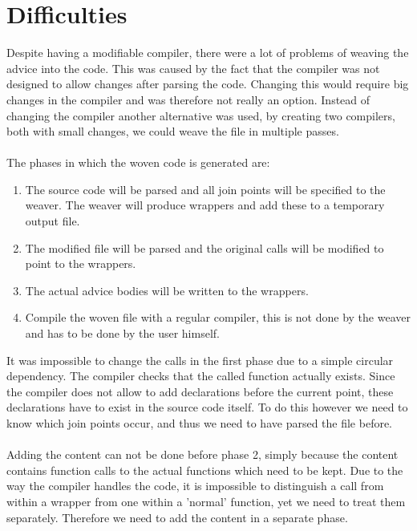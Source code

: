 \documentclass[a4paper]{report}
\begin{document}
\section{Difficulties}
Despite having a modifiable compiler, there were a lot of problems of weaving the advice into the code. This was caused by the fact that the compiler was not designed to allow changes after parsing the code. Changing this would require big changes in the compiler and was therefore not really an option. Instead of changing the compiler another alternative was used, by creating two compilers, both with small changes, we could weave the file in multiple passes.\\
\\
The phases in which the woven code is generated are:
\begin{enumerate}
\item The source code will be parsed and all join points will be specified to the weaver. The weaver will produce wrappers and add these to a temporary output file.
\item The modified file will be parsed and the original calls will be modified to point to the wrappers.
\item The actual advice bodies will be written to the wrappers.
\item Compile the woven file with a regular compiler, this is not done by the weaver and has to be done by the user himself.
\end{enumerate}
It was impossible to change the calls in the first phase due to a simple circular dependency. The compiler checks that the called function actually exists. Since the compiler does not allow to add declarations before the current point, these declarations have to exist in the source code itself. To do this however we need to know which join points occur, and thus we need to have parsed the file before.\\
\\
Adding the content can not be done before phase 2, simply because the content contains function calls to the actual functions which need to be kept. Due to the way the compiler handles the code, it is impossible to distinguish a call from within a wrapper from one within a 'normal' function, yet we need to treat them separately. Therefore we need to add the content in a separate phase.
\end{document}
